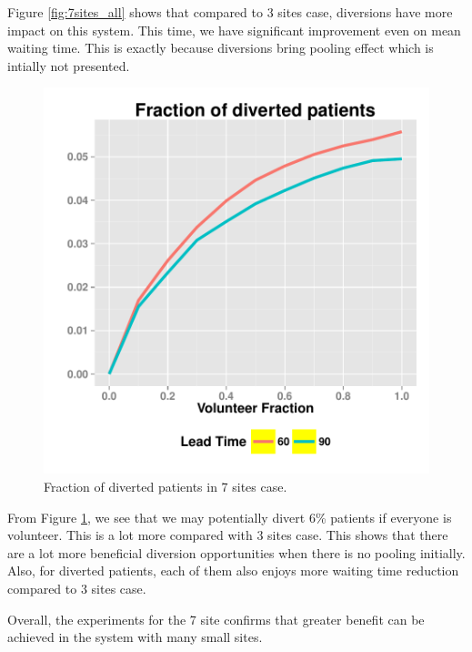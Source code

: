 Figure \ref{fig:7sites_all} shows that compared to 3 sites case,
diversions have more impact on this system. This time, we have
significant improvement even on mean waiting time. This is exactly
because diversions bring pooling effect which is intially not
presented.

\begin{figure}[htp]
\centering
\includegraphics[width=.6\textwidth]{chap3/numeric/pic/7sites_all_diversion}
\caption{Fraction of diverted patients in 7 sites case.}
\label{fig:7sites_all_diversion}
\end{figure}

From Figure \ref{fig:7sites_all_diversion}, we see that we may potentially
divert 6\% patients if everyone is volunteer. This is a lot more compared
with 3 sites case. This shows that there are a lot more
beneficial diversion opportunities when there is no pooling initially. Also, for
diverted patients, each of them also enjoys more waiting time reduction
compared to 3 sites case.

Overall, the experiments for the 7 site confirms that greater benefit can
be achieved in the system with many small sites.

